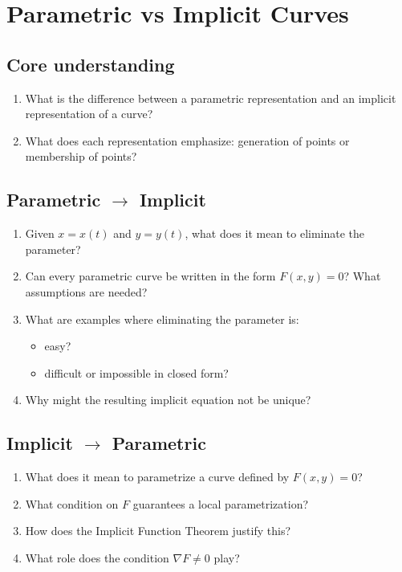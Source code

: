 \section{Parametric vs Implicit Curves}

\subsection{Core understanding}

\begin{enumerate}
  \item What is the difference between a parametric representation and an implicit representation of a curve?
  \item What does each representation emphasize: generation of points or membership of points?
\end{enumerate}

\subsection{Parametric $\to$ Implicit}

\begin{enumerate}[resume]
  \item Given $x = x(t)$ and $y = y(t)$, what does it mean to eliminate the parameter?
  \item Can every parametric curve be written in the form $F(x,y) = 0$? What assumptions are needed?
  \item What are examples where eliminating the parameter is:
    \begin{itemize}
      \item easy?
      \item difficult or impossible in closed form?
    \end{itemize}
  \item Why might the resulting implicit equation not be unique?
\end{enumerate}

\subsection{Implicit $\to$ Parametric}

\begin{enumerate}[resume]
  \item What does it mean to parametrize a curve defined by $F(x,y) = 0$?
  \item What condition on $F$ guarantees a local parametrization?
  \item How does the Implicit Function Theorem justify this?
  \item What role does the condition $\nabla F \neq 0$ play?
\end{enumerate}

